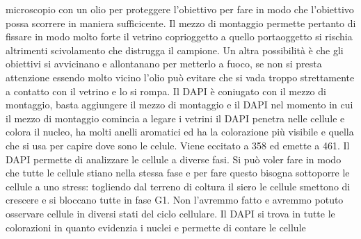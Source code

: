 microscopio con un olio per proteggere l'obiettivo per fare in modo che l'obiettivo possa scorrere in maniera sufficicente. Il mezzo di montaggio permette pertanto di fissare in modo 
molto forte il vetrino coprioggetto a quello portaoggetto si rischia altrimenti scivolamento che distrugga il campione. Un altra possibilit\`a \`e che gli obiettivi si avvicinano e 
allontanano per metterlo a fuoco, se non si presta attenzione essendo molto vicino l'olio pu\`o evitare che si vada troppo strettamente a contatto con il vetrino e lo si rompa. Il DAPI
\`e coniugato con il mezzo di montaggio, basta aggiungere il mezzo di montaggio e il DAPI nel momento in cui il mezzo di montaggio comincia a legare i vetrini il DAPI penetra nelle 
cellule e colora il nucleo, ha molti anelli aromatici ed ha la colorazione pi\`u visibile e quella che si usa per capire dove sono le celule. Viene eccitato a 358 ed emette a 461. Il DAPI
permette di analizzare le cellule a diverse fasi. Si pu\`o voler fare in modo che tutte le cellule stiano nella stessa fase e per fare questo bisogna sottoporre le cellule a uno stress:
togliendo dal terreno di coltura il siero le cellule smettono di crescere e si bloccano tutte in fase G1. Non l'avremmo fatto e avremmo potuto osservare cellule in diversi stati del 
ciclo cellulare. Il DAPI si trova in tutte le colorazioni in quanto evidenzia i nuclei e permette di contare le cellule

